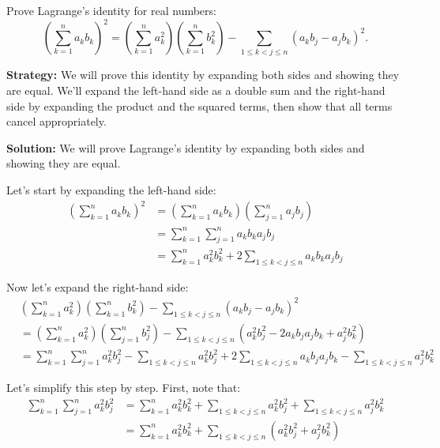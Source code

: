 \begin{problembox}
\begin{problemstatement}
Prove Lagrange's identity for real numbers:
\[
\left( \sum_{k=1}^n a_k b_k \right)^2 = \left( \sum_{k=1}^n a_k^2 \right)\left( \sum_{k=1}^n b_k^2 \right) - \sum_{1 \leq k < j \leq n} (a_k b_j - a_j b_k)^2.
\]
\end{problemstatement}
\end{problembox}

\noindent\textbf{Strategy:} We will prove this identity by expanding both sides and showing they are equal. We'll expand the left-hand side as a double sum and the right-hand side by expanding the product and the squared terms, then show that all terms cancel appropriately.

\bigskip\noindent\textbf{Solution:}
We will prove Lagrange's identity by expanding both sides and showing they are equal.

Let's start by expanding the left-hand side:
\begin{align*}
\left( \sum_{k=1}^n a_k b_k \right)^2 &= \left( \sum_{k=1}^n a_k b_k \right) \left( \sum_{j=1}^n a_j b_j \right) \\
&= \sum_{k=1}^n \sum_{j=1}^n a_k b_k a_j b_j \\
&= \sum_{k=1}^n a_k^2 b_k^2 + 2 \sum_{1 \leq k < j \leq n} a_k b_k a_j b_j
\end{align*}

Now let's expand the right-hand side:
\begin{align*}
&\left( \sum_{k=1}^n a_k^2 \right)\left( \sum_{k=1}^n b_k^2 \right) - \sum_{1 \leq k < j \leq n} (a_k b_j - a_j b_k)^2 \\
&= \left( \sum_{k=1}^n a_k^2 \right)\left( \sum_{j=1}^n b_j^2 \right) - \sum_{1 \leq k < j \leq n} (a_k^2 b_j^2 - 2a_k b_j a_j b_k + a_j^2 b_k^2) \\
&= \sum_{k=1}^n \sum_{j=1}^n a_k^2 b_j^2 - \sum_{1 \leq k < j \leq n} a_k^2 b_j^2 + 2 \sum_{1 \leq k < j \leq n} a_k b_j a_j b_k - \sum_{1 \leq k < j \leq n} a_j^2 b_k^2
\end{align*}

Let's simplify this step by step. First, note that:
\begin{align*}
\sum_{k=1}^n \sum_{j=1}^n a_k^2 b_j^2 &= \sum_{k=1}^n a_k^2 b_k^2 + \sum_{1 \leq k < j \leq n} a_k^2 b_j^2 + \sum_{1 \leq k < j \leq n} a_j^2 b_k^2 \\
&= \sum_{k=1}^n a_k^2 b_k^2 + \sum_{1 \leq k < j \leq n} (a_k^2 b_j^2 + a_j^2 b_k^2)
\end{align*}

